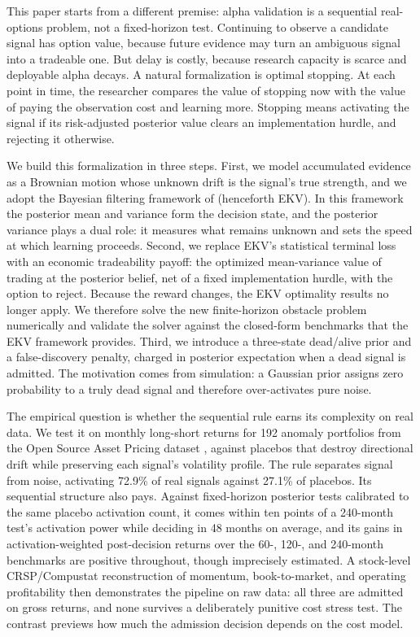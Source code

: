 \documentclass[11pt]{article}
\begin{document}
This paper starts from a different premise: alpha validation is a sequential
real-options problem, not a fixed-horizon test.  Continuing to observe a candidate
signal has option value, because future evidence may turn an ambiguous signal into a
tradeable one.  But delay is costly, because research capacity is scarce and deployable
alpha decays.  A natural formalization is optimal stopping.  At each point in time,
the researcher compares the value of stopping now with the value of paying the
observation cost and learning more.  Stopping means activating the signal if its
risk-adjusted posterior value clears an implementation hurdle, and rejecting it
otherwise.

We build this formalization in three steps.  First, we model accumulated evidence as a
Brownian motion whose unknown drift is the signal's true strength, and we adopt the
Bayesian filtering framework of \citet{ekstromKaratzasVaicenavicius2022} (henceforth
EKV).  In this framework the posterior mean and variance form the decision state, and
the posterior variance plays a dual role: it measures what remains unknown and sets
the speed at which learning proceeds.  Second, we replace EKV's statistical terminal
loss with an economic tradeability payoff: the optimized mean-variance value of
trading at the posterior belief, net of a fixed implementation hurdle, with the option
to reject.  Because the reward changes, the EKV optimality results no longer apply.
We therefore solve the new finite-horizon obstacle problem numerically and validate
the solver against the closed-form benchmarks that the EKV framework provides.  Third,
we introduce a three-state dead/alive prior and a false-discovery penalty, charged in
posterior expectation when a dead signal is admitted.  The motivation comes from
simulation: a Gaussian prior assigns zero probability to a truly dead signal and
therefore over-activates pure noise.

The empirical question is whether the sequential rule earns its complexity on real
data.  We test it on monthly long-short returns for 192 anomaly portfolios from the
Open Source Asset Pricing dataset \citep{chenZimmermann2022}, against placebos that
destroy directional drift while preserving each signal's volatility profile.  The rule
separates signal from noise, activating 72.9\% of real signals against 27.1\% of
placebos.  Its sequential structure also pays.  Against fixed-horizon posterior tests
calibrated to the same placebo activation count, it comes within ten points of a
240-month test's activation power while deciding in 48 months on average, and its
gains in activation-weighted post-decision returns over the 60-, 120-, and 240-month
benchmarks are positive throughout, though imprecisely estimated.  A stock-level
CRSP/Compustat reconstruction of momentum, book-to-market, and operating profitability
then demonstrates the pipeline on raw data: all three are admitted on gross returns,
and none survives a deliberately punitive cost stress test.  The contrast previews how
much the admission decision depends on the cost model.
\end{document}
